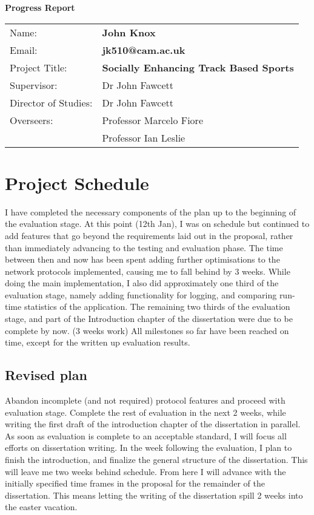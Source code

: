 \documentclass{article}
\begin{document}
\huge{\bf Progress Report}

{\large
\begin{tabular}{ll}
Name:                & \bf John Knox                             \\
Email:               & \bf jk510@cam.ac.uk                       \\
Project Title:       & \bf Socially Enhancing Track Based Sports \\
Supervisor:          & Dr John Fawcett                           \\
Director of Studies: & Dr John Fawcett                           \\
Overseers:           & Professor Marcelo Fiore                   \\
                     & Professor Ian Leslie                      \\
\end{tabular}
}

\normalsize
\section*{Project Schedule}

I have completed the necessary components of the plan up to the beginning of the evaluation stage.
At this point (12th Jan), I was on schedule but continued to add features that go beyond the requirements laid out in the proposal, rather than immediately advancing to the testing and evaluation phase. The time between then and now has been spent adding further optimisations to the network protocols implemented, causing me to fall behind by 3 weeks.
While doing the main implementation, I also did approximately one third of the evaluation stage, namely adding functionality for logging, and comparing run-time statistics of the application. The remaining two thirds of the evaluation stage, and part of the Introduction chapter of the dissertation were due to be complete by now. (3 weeks work)
All milestones so far have been reached on time, except for the written up evaluation results.

\subsection*{Revised plan}
Abandon incomplete (and not required) protocol features and proceed with evaluation stage.
Complete the rest of evaluation in the next 2 weeks, while writing the first draft of the introduction chapter of the dissertation in parallel.
As soon as evaluation is complete to an acceptable standard, I will focus all efforts on dissertation writing.
In the week following the evaluation, I plan to finish the introduction, and finalize the general structure of the dissertation.
This will leave me two weeks behind schedule.
From here I will advance with the initially specified time frames in the proposal for the remainder of the dissertation. This means letting the writing of the dissertation spill 2 weeks into the easter vacation.
\end{document}
